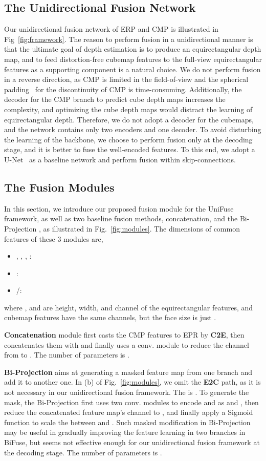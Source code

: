 \documentclass[letterpaper, 10 pt, conference]{ieeeconf}
\begin{document}
\subsection{The Unidirectional Fusion Network}
Our unidirectional fusion network of ERP and CMP is illustrated in Fig~\ref{fig:framework}.
The reason to perform fusion in a unidirectional manner is that
the ultimate goal of  depth estimation is to produce an equirectangular depth map, and to feed distortion-free cubemap features to the full-view equirectangular features as a supporting component is a natural choice. We do not perform fusion in a reverse direction, as CMP is limited in the field-of-view and the spherical padding~\cite{wang2020bifuse} for the discontinuity of CMP is time-consuming. 
Additionally, the decoder for the CMP branch to predict cube depth maps increases the complexity, and optimizing the cube depth maps would distract the learning of equirectangular depth. Therefore, we do not adopt a decoder for the cubemaps, and the network contains only two encoders and one decoder. 
To avoid disturbing the learning of the backbone, we choose to perform fusion only at the decoding stage, and it is better to fuse the well-encoded features. To this end, we adopt a U-Net~\cite{ronneberger2015u} as a baseline network and perform fusion within skip-connections.


\subsection{The Fusion Modules}
In this section, we introduce our proposed fusion module for the UniFuse framework, as well as two baseline fusion methods, concatenation, and the Bi-Projection \cite{wang2020bifuse}, as illustrated in Fig.~\ref{fig:modules}. The dimensions of common features of these 3 modules are,
\begin{itemize}
\item , , , : 
\item : 
\item /: 
\end{itemize}
where ,  and  are height, width, and channel of the equirectangular features, and cubemap features have the same channels, but the face size is just .


\textbf{Concatenation} module first casts the CMP features to EPR by \textbf{C2E}, then concatenates them with  and finally uses a  conv. module to reduce the channel from  to . The number of parameters is . 

\textbf{Bi-Projection} \cite{wang2020bifuse} aims at generating a masked feature map from one branch and add it to another one. In (b) of Fig.~\ref{fig:modules}, we omit the \textbf{E2C} path, as it is not necessary in our unidirectional fusion framework. The  is . To generate the mask, the Bi-Projection first uses two  conv. modules to encode  and  as   and , then reduce the concatenated feature map's channel to , and finally apply a Sigmoid function to scale the  between  and . Such masked modification in Bi-Projection may be useful in gradually improving the feature learning in two branches in BiFuse, but seems not effective enough for our unidirectional fusion framework at the decoding stage. The number of parameters is . 
\end{document}
